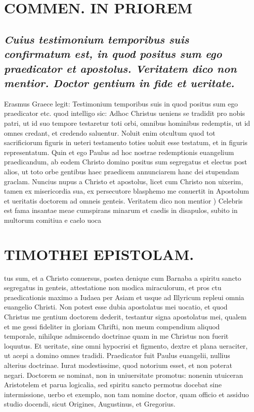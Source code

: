 \documentclass{article}
\begin{document}
\begin{pages}
\section*{COMMEN. IN PRIOREM }
\marginpar{[ p.52 ]}
\marginpar{[ p.53 ]}
{}
\subsection*{\textit{Cuius testimonium temporibus suis confirmatum est, in quod positus sum ego praedicator et apostolus. Veritatem dico non mentior. Doctor gentium in fide et ueritate. }}\pstart Erasmus Graece legit: Testimonium temporibus suis in quod positus sum ego praedicator etc. quod intelligo sic: Adhoc Christus ueniens se tradidit pro nobis patri, ut id suo tempore testaretur toti orbi, omnibus hominibus redemptis, ut id omnes credant, et credendo saluentur. Noluit enim otcultum quod tot sacrificiorum figuris in ueteri testamento toties uoluit esse testatum, et in figuris representatum. Quin et ego Paulus ad hoc nostrae redemptionis euangelium praedicandum, ab eodem Christo domino positus sum segregatus et electus post alios, ut toto orbe gentibus haec praedicem annunciarem hanc dei stupendam graclam. Nuncius nupus a Christo et apostolus, licet cum Christo non uixerim, tamen ex misericordia sua, ex persecutore blasphemo me conuertit in Apostolum et ueritatis doctorem ad omneis genteis.  \pend\pstart Veritatem dico non mentior ) Celebris est fama insantae meae cumspirans minarum et caedis in disapulos, subito in multorum comitiua e caelo uoca\pend
\section*{TIMOTHEI EPISTOLAM. }
\marginpar{[ p.54 ]}\pstart tus sum, et a Christo conuersus, postea denique cum Barnaba a spiritu sancto segregatus in genteis, attestatione non modica miraculorum, et pros ctu praedicationis maximo a Iudaea per Asiam et usque ad Illyricum repleui omnia euangelio Christi. Non potest esse dubia apostolatus mei uocatio, et quod Christus me gentium doctorem dederit, testantur signa apostolatus mei, qualem et me gessi fideliter in gloriam Chrifti, non meum compendium aliquod temporale, nihilque admiscendo doctrinae quam in me Christus non fuerit loquutus. Et ueritate, sine omni hypocrisi et figmento, dextre et plana ueraciter, ut acepi a domino omnes tradidi.  \pend\pstart Praedicator fuit Paulus euangelii, nullius alterius doctrinae. Iurat modestissime, quod notorium esset, et non poterat negari. Doctorem se nominat, non in uniuersitate promotus: nonenin utuiceran Aristotelem et parua logicalia, sed spiritu sancto permotus docebat sine intermissione, uerbo et exemplo, non tam nomine doctor, quam officio et assiduo studio docendi, sicut Origines, Augustinus, et Gregorius.  \pend
{}
{}

\end{pages}
\end{document}
